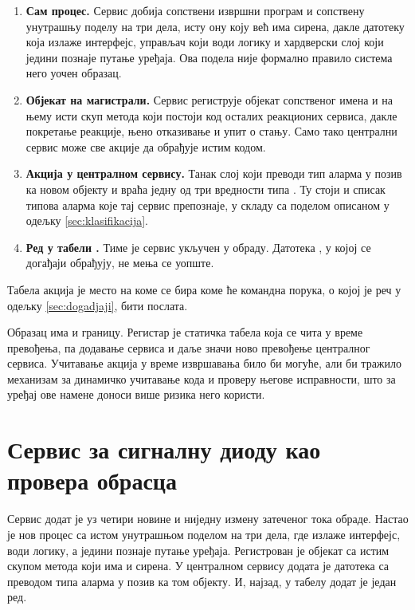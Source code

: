 \documentclass[12pt,oneside]{memoir}
\begin{document}
\begin{enumerate}
  \item \textbf{Сам процес.} Сервис добија сопствени извршни програм и сопствену унутрашњу
        поделу на три дела, исту ону коју већ има сирена, дакле датотеку која излаже
         интерфејс, управљач који води логику и хардверски слој који једини
        познаје путање уређаја. Ова подела није формално правило система него уочен образац.

  \item \textbf{Објекат на магистрали.} Сервис региструје  објекат сопственог
        имена и на њему исти скуп метода који постоји код осталих реакционих сервиса, дакле
        покретање реакције, њено отказивање и упит о стању. Само тако централни сервис може
        све акције да обрађује истим кодом.

  \item \textbf{Акција у централном сервису.} Танак слој који преводи тип аларма у позив ка
        новом објекту и враћа једну од три вредности типа . Ту стоји и
        списак типова аларма које тај сервис препознаје, у складу са поделом описаном у
        одељку \ref{sec:klasifikacija}.

  \item \textbf{Ред у табели .} Тиме је сервис укључен у обраду.
        Датотека , у којој се догађаји обрађују, не мења се уопште.
\end{enumerate}

Табела акција је место на коме се бира коме ће командна порука, о којој је реч у одељку 
\ref{sec:dogadjaji}, бити послата.

Образац има и границу. Регистар је статичка табела која се чита у време превођења, па додавање сервиса и даље значи ново превођење централног сервиса. Учитавање
акција у време извршавања било би могуће, али би тражило механизам за динамичко учитавање
кода и проверу његове исправности, што за уређај ове намене доноси више ризика него користи.

\section{Сервис за сигналну диоду као провера обрасца}
\label{sec:led-dokaz}

Сервис  додат је уз четири новине и ниједну измену затеченог
тока обраде. Настао је нов процес са истом унутрашњом поделом на три дела, где 
излаже  интерфејс,  води логику, а
 једини познаје путање уређаја. Регистрован је објекат 
са истим скупом метода који има и сирена. У централном сервису додата је датотека
 са преводом типа аларма у позив ка том објекту. И, најзад, у
табелу  додат је један ред.
\end{document}
